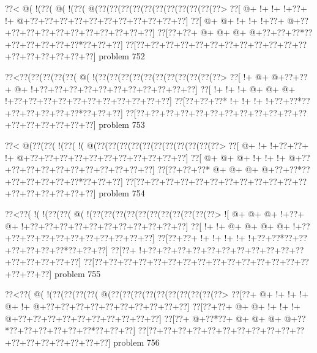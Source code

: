\vbox{\vbox{\goo
\0??<\- @(\- !(\0??(\- @(\- !(\0??(\- @(\0??(\0??(\0??(\0??(\0??(\0??(\0??(\0??(\0??(\0??(\0??>
\0??[\- @+\- !+\- !+\- !+\0??+\- !+\- @+\0??+\0??+\0??+\0??+\0??+\0??+\0??+\0??+\0??+\0??+\0??]
\0??[\- @+\- @+\- !+\- !+\- !+\0??+\- @+\0??+\0??+\0??+\0??+\0??+\0??+\0??+\0??+\0??+\0??+\0??]
\0??[\0??+\0??+\- @+\- @+\- @+\- @+\0??+\0??+\0??*\0??+\0??+\0??+\0??+\0??+\0??*\0??+\0??+\0??]
\0??[\0??+\0??+\0??+\0??+\0??+\0??+\0??+\0??+\0??+\0??+\0??+\0??+\0??+\0??+\0??+\0??+\0??+\0??]
}
\hfil problem 752\hfil\break
}



\vbox{\vbox{\goo
\0??<\0??(\0??(\0??(\0??(\0??(\- @(\- !(\0??(\0??(\0??(\0??(\0??(\0??(\0??(\0??(\0??(\0??(\0??>
\0??[\- !+\- @+\- @+\0??+\0??+\- @+\- !+\0??+\0??+\0??+\0??+\0??+\0??+\0??+\0??+\0??+\0??+\0??]
\0??[\- !+\- !+\- !+\- @+\- @+\- @+\- !+\0??+\0??+\0??+\0??+\0??+\0??+\0??+\0??+\0??+\0??+\0??]
\0??[\0??+\0??+\0??*\- !+\- !+\- !+\- !+\0??+\0??*\0??+\0??+\0??+\0??+\0??+\0??*\0??+\0??+\0??]
\0??[\0??+\0??+\0??+\0??+\0??+\0??+\0??+\0??+\0??+\0??+\0??+\0??+\0??+\0??+\0??+\0??+\0??+\0??]
}
\hfil problem 753\hfil\break
}



\vbox{\vbox{\goo
\0??<\- @(\0??(\0??(\- !(\0??(\- !(\- @(\0??(\0??(\0??(\0??(\0??(\0??(\0??(\0??(\0??(\0??(\0??>
\0??[\- @+\- !+\- !+\0??+\0??+\- !+\- @+\0??+\0??+\0??+\0??+\0??+\0??+\0??+\0??+\0??+\0??+\0??]
\0??[\- @+\- @+\- @+\- !+\- !+\- !+\- @+\0??+\0??+\0??+\0??+\0??+\0??+\0??+\0??+\0??+\0??+\0??]
\0??[\0??+\0??+\0??*\- @+\- @+\- @+\- @+\0??+\0??*\0??+\0??+\0??+\0??+\0??+\0??*\0??+\0??+\0??]
\0??[\0??+\0??+\0??+\0??+\0??+\0??+\0??+\0??+\0??+\0??+\0??+\0??+\0??+\0??+\0??+\0??+\0??+\0??]
}
\hfil problem 754\hfil\break
}



\vbox{\vbox{\goo
\0??<\0??(\- !(\- !(\0??(\0??(\- @(\- !(\0??(\0??(\0??(\0??(\0??(\0??(\0??(\0??(\0??(\0??(\0??>
\- ![\- @+\- @+\- @+\- !+\0??+\- @+\- !+\0??+\0??+\0??+\0??+\0??+\0??+\0??+\0??+\0??+\0??+\0??]
\0??[\- !+\- !+\- @+\- @+\- @+\- @+\- !+\0??+\0??+\0??+\0??+\0??+\0??+\0??+\0??+\0??+\0??+\0??]
\0??[\0??+\0??+\- !+\- !+\- !+\- !+\- !+\0??+\0??*\0??+\0??+\0??+\0??+\0??+\0??*\0??+\0??+\0??]
\0??[\0??+\- !+\0??+\0??+\0??+\0??+\0??+\0??+\0??+\0??+\0??+\0??+\0??+\0??+\0??+\0??+\0??+\0??]
\0??[\0??+\0??+\0??+\0??+\0??+\0??+\0??+\0??+\0??+\0??+\0??+\0??+\0??+\0??+\0??+\0??+\0??+\0??]
}
\hfil problem 755\hfil\break
}



\vbox{\vbox{\goo
\0??<\0??(\- @(\- !(\0??(\0??(\0??(\0??(\- @(\0??(\0??(\0??(\0??(\0??(\0??(\0??(\0??(\0??(\0??>
\0??[\0??+\- @+\- !+\- !+\- !+\- @+\- !+\- @+\0??+\0??+\0??+\0??+\0??+\0??+\0??+\0??+\0??+\0??]
\0??[\0??+\0??+\- @+\- @+\- !+\- !+\- !+\- @+\0??+\0??+\0??+\0??+\0??+\0??+\0??+\0??+\0??+\0??]
\0??[\0??+\- @+\0??*\0??+\- @+\- @+\- @+\- @+\0??*\0??+\0??+\0??+\0??+\0??+\0??*\0??+\0??+\0??]
\0??[\0??+\0??+\0??+\0??+\0??+\0??+\0??+\0??+\0??+\0??+\0??+\0??+\0??+\0??+\0??+\0??+\0??+\0??]
}
\hfil problem 756\hfil\break
}



